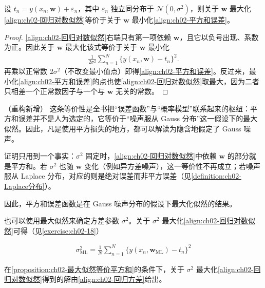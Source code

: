 \documentclass[../../main.tex]{subfiles}
\begin{document}
\begin{proposition}\label{proposition:ch02-最大似然等价平方和}
设 $t_n=y(x_n,\mathbf{w})+\varepsilon_n$，其中 $\varepsilon_n$ 独立同分布于 $\mathcal{N}(0,\sigma^{2})$，则关于 $\mathbf{w}$ 最大化\eqref{align:ch02-回归对数似然}等价于关于 $\mathbf{w}$ 最小化\eqref{align:ch02-平方和误差}。
\end{proposition}

\begin{proof}
\eqref{align:ch02-回归对数似然}右端只有第一项依赖 $\mathbf{w}$，且它以负号出现、系数为正。因此关于 $\mathbf{w}$ 最大化该式等价于关于 $\mathbf{w}$ 最小化
\begin{align*}
  \frac{1}{2\sigma^{2}}\sum_{n=1}^{N}\big\{y(x_n,\mathbf{w})-t_n\big\}^{2} .
\end{align*}
再乘以正常数 $2\sigma^{2}$（不改变最小值点）即得\eqref{align:ch02-平方和误差}。反过来，最小化\eqref{align:ch02-平方和误差}的点也使\eqref{align:ch02-回归对数似然}取最大，因为二者只相差一个正常数因子与一个与 $\mathbf{w}$ 无关的常数。
\end{proof}

\begin{remark}（重构新增）
这条等价性是全书把“误差函数”与“概率模型”联系起来的枢纽：平方和误差并不是人为选定的，它等价于“噪声服从 Gauss 分布”这一假设下的最大似然。因此，凡是使用平方损失的地方，都可以解读为隐含地假定了 Gauss 噪声。

证明只用到一个事实：$\sigma^{2}$ 固定时，\eqref{align:ch02-回归对数似然}中依赖 $\mathbf{w}$ 的部分就是平方和。若 $\sigma^{2}$ 也随 $\mathbf{w}$ 变化（例如异方差噪声），这一等价性不再成立；若噪声服从 Laplace 分布，对应的则是绝对误差而非平方误差（见\cref{definition:ch02-Laplace分布}）。
\end{remark}

因此，平方和误差函数是在 Gauss 噪声分布的假设下最大化似然的结果。

也可以使用最大似然来确定方差参数 $\sigma^{2}$。关于 $\sigma^{2}$ 最大化\eqref{align:ch02-回归对数似然}可得（见\cref{exercise:ch02-18}）

\begin{align}
  \sigma_{\mathrm{ML}}^{2} = \frac{1}{N}\sum_{n=1}^{N}\big\{y(x_n,\mathbf{w}_{\mathrm{ML}})-t_n\big\}^{2}
  \label{align:ch02-回归方差}
\end{align}

\begin{proposition}[噪声方差的最大似然解]\label{proposition:ch02-回归方差}
在\cref{proposition:ch02-最大似然等价平方和}的条件下，关于 $\sigma^{2}$ 最大化\eqref{align:ch02-回归对数似然}得到的解由\eqref{align:ch02-回归方差}给出。
\end{proposition}
\end{document}
